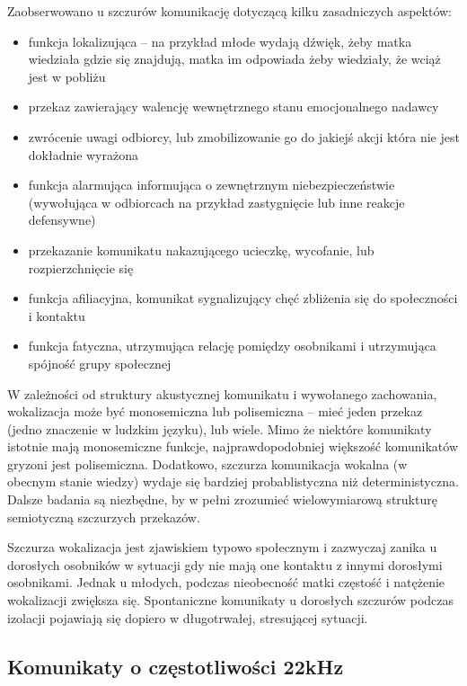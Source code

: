 \documentclass{psychol}
\begin{document}
Zaobserwowano u szczurów komunikację dotyczącą kilku zasadniczych aspektów:
\begin{itemize}
    \item funkcja lokalizująca -- na przykład młode wydają dźwięk, żeby matka wiedziała gdzie się znajdują, matka im odpowiada żeby wiedziały, że wciąż jest w pobliżu
    \item przekaz zawierający walencję wewnętrznego stanu emocjonalnego nadawcy
    \item zwrócenie uwagi odbiorcy, lub zmobilizowanie go do jakiejś akcji która nie jest dokładnie wyrażona
    \item funkcja alarmująca informująca o zewnętrznym niebezpieczeństwie (wywołująca w odbiorcach na przykład zastygnięcie lub inne reakcje defensywne)
    \item przekazanie komunikatu nakazującego ucieczkę, wycofanie, lub rozpierzchnięcie się
    \item funkcja afiliacyjna, komunikat sygnalizujący chęć zbliżenia się do społeczności i kontaktu
    \item funkcja fatyczna, utrzymująca relację pomiędzy osobnikami i utrzymująca spójność grupy społecznej
\end{itemize}

W zależności od struktury akustycznej komunikatu i wywołanego zachowania, wokalizacja może być monosemiczna lub polisemiczna -- mieć jeden przekaz (jedno znaczenie w ludzkim języku), lub wiele. Mimo że niektóre komunikaty istotnie mają monosemiczne funkcje, najprawdopodobniej większość komunikatów gryzoni jest polisemiczna. Dodatkowo, szczurza komunikacja \colorbox{yellow!30}{wokalna} (w obecnym stanie wiedzy) wydaje się bardziej probablistyczna niż deterministyczna. Dalsze badania są niezbędne, by w pełni zrozumieć wielowymiarową strukturę semiotyczną szczurzych przekazów.

Szczurza wokalizacja jest zjawiskiem typowo społecznym i zazwyczaj zanika u dorosłych osobników w sytuacji gdy nie mają one kontaktu z innymi dorosłymi osobnikami. Jednak u młodych, podczas nieobecność matki częstość i natężenie wokalizacji zwiększa się. Spontaniczne komunikaty u dorosłych szczurów podczas izolacji pojawiają się dopiero w długotrwałej, stresującej sytuacji.

\subsection{Komunikaty o częstotliwości 22kHz}
\end{document}
